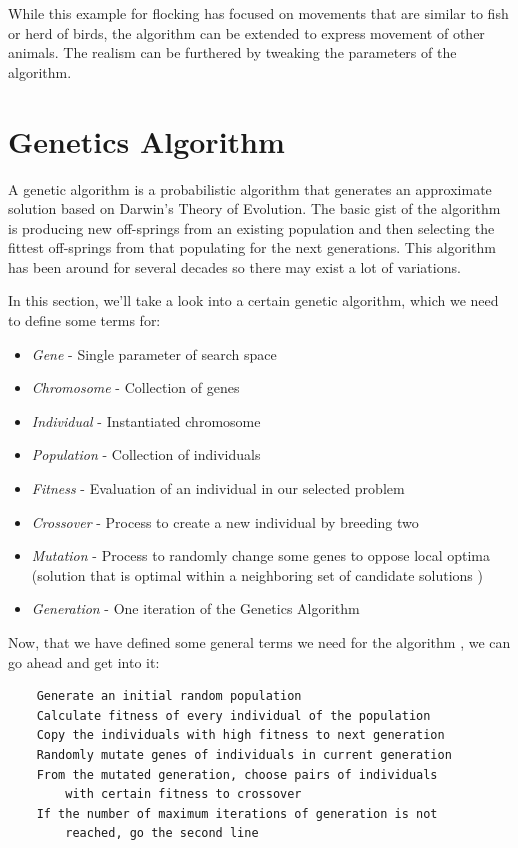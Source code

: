 \documentclass[a4paper, 12pt]{book}
\begin{document}
While this example for flocking \cite{FlocksReynolds} has focused on movements that are similar to fish or herd of birds, the algorithm can be extended to express movement of other animals. The realism can be furthered by tweaking the parameters of the algorithm.

\section{Genetics Algorithm}

A genetic algorithm \cite{GameAIGeneticAlg} is a probabilistic algorithm that generates an approximate solution based on Darwin’s Theory of Evolution. The basic gist of the algorithm is producing new off-springs from an existing population and then selecting the fittest off-springs from that populating for the next generations. This algorithm has been around for several decades so there may exist a lot of variations.

In this section, we'll take a look into a certain genetic algorithm, which we need to define some terms for:

\begin{itemize}
    \item \emph{Gene} - Single parameter of search space
    \item \emph{Chromosome} - Collection of genes
    \item \emph{Individual} - Instantiated chromosome
    \item \emph{Population} - Collection of individuals
    \item \emph{Fitness} - Evaluation of an individual in our selected problem
    \item \emph{Crossover} - Process to create a new individual by breeding two
    \item \emph{Mutation} - Process to randomly change some genes to oppose local optima (solution that is optimal within a neighboring set of candidate solutions \cite{LocalOptimum}) 
    \item \emph{Generation} - One iteration of the Genetics Algorithm
\end{itemize}

\clearpage

Now, that we have defined some general terms we need for the algorithm \cite{GameAIGeneticAlg}, we can go ahead and get into it:

\begin{verbatim}
    Generate an initial random population
    Calculate fitness of every individual of the population
    Copy the individuals with high fitness to next generation
    Randomly mutate genes of individuals in current generation
    From the mutated generation, choose pairs of individuals 
        with certain fitness to crossover
    If the number of maximum iterations of generation is not 
        reached, go the second line
\end{verbatim}
\end{document}

